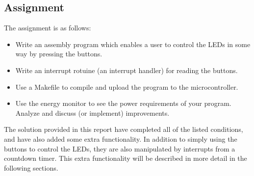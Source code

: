 \subsection{Assignment}
The assignment is as follows:

\begin{itemize}
    \item   Write an assembly program which enables a user to control the LEDs in some way by pressing the buttons.
    \item   Write an interrupt rotuine (an interrupt handler) for reading the buttons.
    \item   Use a Makefile to compile and upload the program to the microcontroller.
    \item   Use the energy monitor to see the power requirements of your program. Analyze and
            discuss (or implement) improvements. 
    \end{itemize}


The solution provided in this report have completed all of the listed conditions, and have also added some extra functionality. In addition to simply using the buttons to control the LEDs, they are also manipulated by interrupts from a countdown timer. This extra functionality will be described in more detail in the following sections. 